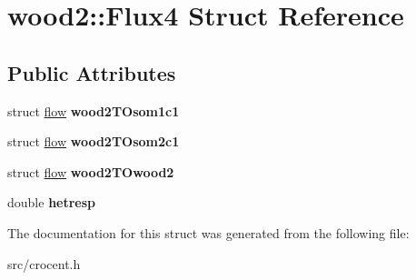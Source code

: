 \hypertarget{structwood2_1_1_flux4}{\section{wood2\-:\-:Flux4 Struct Reference}
\label{structwood2_1_1_flux4}
}
\subsection*{Public Attributes}
\begin{DoxyCompactItemize}
\item 
\hypertarget{structwood2_1_1_flux4_a3494b7a60a10bfd6a86ad8b205ca3d24}{struct \hyperlink{structflow}{flow} {\bfseries wood2\-T\-Osom1c1}}\label{structwood2_1_1_flux4_a3494b7a60a10bfd6a86ad8b205ca3d24}

\item 
\hypertarget{structwood2_1_1_flux4_a9d761eeaaab895929da066a67bb4e828}{struct \hyperlink{structflow}{flow} {\bfseries wood2\-T\-Osom2c1}}\label{structwood2_1_1_flux4_a9d761eeaaab895929da066a67bb4e828}

\item 
\hypertarget{structwood2_1_1_flux4_a0c4adab8f86acb86b99e43b9d1f933e3}{struct \hyperlink{structflow}{flow} {\bfseries wood2\-T\-Owood2}}\label{structwood2_1_1_flux4_a0c4adab8f86acb86b99e43b9d1f933e3}

\item 
\hypertarget{structwood2_1_1_flux4_abd8f2398cd1b9941d1e6ab98fc720d40}{double {\bfseries hetresp}}\label{structwood2_1_1_flux4_abd8f2398cd1b9941d1e6ab98fc720d40}

\end{DoxyCompactItemize}


The documentation for this struct was generated from the following file\-:\begin{DoxyCompactItemize}
\item 
src/crocent.\-h\end{DoxyCompactItemize}
